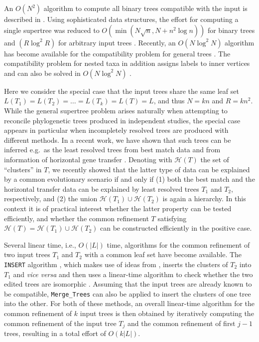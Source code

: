 \documentclass[11pt]{article}
\newcommand{\HH}{\mathcal{H}}
\begin{document}
An $O(N^2)$ algorithm to compute all binary trees compatible with the input
is described in \cite{Constantinescu:95}.  Using sophisticated data
structures, the effort for computing a single supertree was reduced to
$O(\min(N \sqrt{n},N+n^2\log n))$ for binary trees and $(R\log^2 R)$ for
arbitrary input trees \cite{Henzinger:99}. Recently, an $O(N \log^2 N)$
algorithm has become available for the compatibility problem for general
trees \cite{Deng:18}. The compatibility problem for nested taxa in addition
assigns labels to inner vertices and can also be solved in $O(N \log^2 N)$
\cite{Deng:17}.

Here we consider the special case that the input trees share the same leaf
set $L(T_1)=L(T_2)=\dots=L(T_k)=L(T)=L$, and thus $N=kn$ and
$R=kn^2$. While the general supertree problem arises naturally when
attempting to reconcile phylogenetic trees produced in independent studies,
the special case appears in particular when incompletely resolved trees are
produced with different methods. In a recent work, we have shown that such
trees can be inferred e.g.\ as the least resolved trees from best match
data \cite{Geiss:19a,Schaller:21d} and from information of horizontal gene
transfer \cite{Geiss:18a,Hellmuth:19}.  Denoting with $\HH(T)$ the set of
``clusters'' in $T$, we recently showed that the latter type of data can be
explained by a common evolutionary scenario if and only if (1) both the
best match and the horizontal transfer data can be explained by least
resolved trees $T_1$ and $T_2$, respectively, and (2) the union
$\HH(T_1)\cup\HH(T_2)$ is again a hierarchy. In this context it is of
practical interest whether the latter property can be tested efficiently,
and whether the common refinement $T$ satisfying
$\HH(T)=\HH(T_1)\cup\HH(T_2)$ \cite{Hellmuth:21x} can be constructed
efficiently in the positive case.

Several linear time, i.e., $O(|L|)$ time, algorithms for the common
refinement of two input trees $T_1$ and $T_2$ with a common leaf set have
become available. The \texttt{INSERT} algorithm \cite{Warnow:94}, which
makes use of ideas from \cite{Gusfield:91}, inserts the clusters of $T_2$
into $T_1$ and \emph{vice versa} and then uses a linear-time algorithm to
check whether the two edited trees are isomorphic \cite{Aho:74}.  Assuming
that the input trees are already known to be compatible,
\texttt{Merge_Trees} \cite{Jansson:13,Jansson:16} can also be applied to
insert the clusters of one tree into the other.  For both of these methods,
an overall linear-time algorithm for the common refinement of $k$ input
trees is then obtained by iteratively computing the common refinement of
the input tree $T_j$ and the common refinement of first $j-1$ trees,
resulting in a total effort of $O(k |L|)$.
\end{document}
